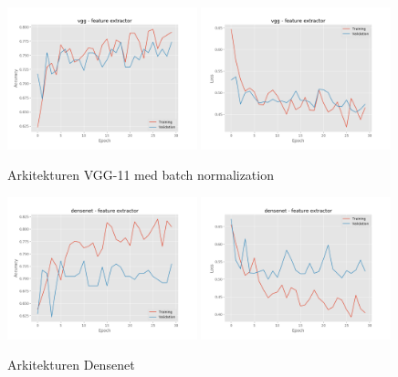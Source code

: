 \documentclass{kththesis}
\begin{document}
  \begin{figure}
    \centering
    \includegraphics[width=0.49\textwidth]{"./fireplace/fireplace-classification - acc - vgg - feature extractor"}
    \includegraphics[width=0.49\textwidth]{"./fireplace/fireplace-classification - loss - vgg - feature extractor"}
    \caption{Arkitekturen VGG-11 med batch normalization}
  \end{figure}

  \begin{figure}
    \centering
    \includegraphics[width=0.49\textwidth]{"./fireplace/fireplace-classification - acc - densenet - feature extractor"}
    \includegraphics[width=0.49\textwidth]{"./fireplace/fireplace-classification - loss - densenet - feature extractor"}
    \caption{Arkitekturen Densenet}
  \end{figure}
\end{document}
